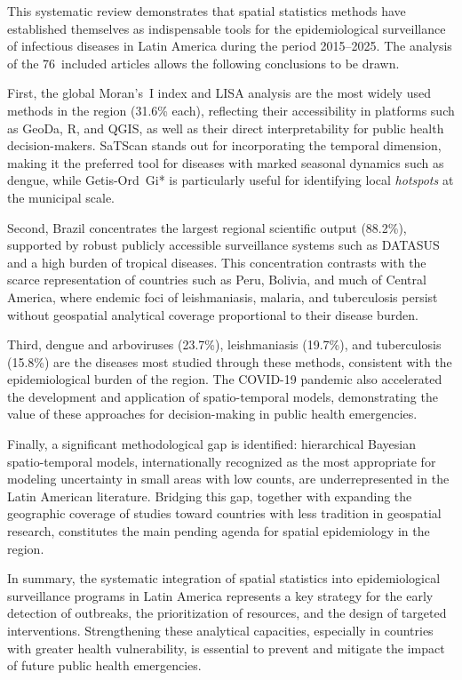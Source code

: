\documentclass[runningheads]{llncs}
\begin{document}
This systematic review demonstrates that spatial statistics
methods have established themselves as indispensable tools
for the epidemiological surveillance of infectious diseases
in Latin America during the period 2015--2025. The analysis
of the 76~included articles allows the following conclusions
to be drawn.

First, the global Moran's~I index and LISA analysis are the
most widely used methods in the region (31.6\% each),
reflecting their accessibility in platforms such as GeoDa,
R, and QGIS, as well as their direct interpretability for
public health decision-makers. SaTScan stands out for
incorporating the temporal dimension, making it the
preferred tool for diseases with marked seasonal dynamics
such as dengue, while Getis-Ord~Gi* is particularly useful
for identifying local \textit{hotspots} at the municipal
scale.

Second, Brazil concentrates the largest regional scientific
output (88.2\%), supported by robust publicly accessible
surveillance systems such as DATASUS and a high burden of
tropical diseases. This concentration contrasts with the
scarce representation of countries such as Peru, Bolivia,
and much of Central America, where endemic foci of
leishmaniasis, malaria, and tuberculosis persist without
geospatial analytical coverage proportional to their disease
burden.

Third, dengue and arboviruses (23.7\%), leishmaniasis
(19.7\%), and tuberculosis (15.8\%) are the diseases most
studied through these methods, consistent with the
epidemiological burden of the region. The COVID-19 pandemic
also accelerated the development and application of
spatio-temporal models, demonstrating the value of these
approaches for decision-making in public health emergencies.

Finally, a significant methodological gap is identified:
hierarchical Bayesian spatio-temporal models, internationally
recognized as the most appropriate for modeling uncertainty
in small areas with low counts, are underrepresented in the
Latin American literature. Bridging this gap, together with
expanding the geographic coverage of studies toward countries
with less tradition in geospatial research, constitutes the
main pending agenda for spatial epidemiology in the region.

In summary, the systematic integration of spatial statistics
into epidemiological surveillance programs in Latin America
represents a key strategy for the early detection of
outbreaks, the prioritization of resources, and the design
of targeted interventions. Strengthening these analytical
capacities, especially in countries with greater health
vulnerability, is essential to prevent and mitigate the
impact of future public health emergencies.
\end{document}
